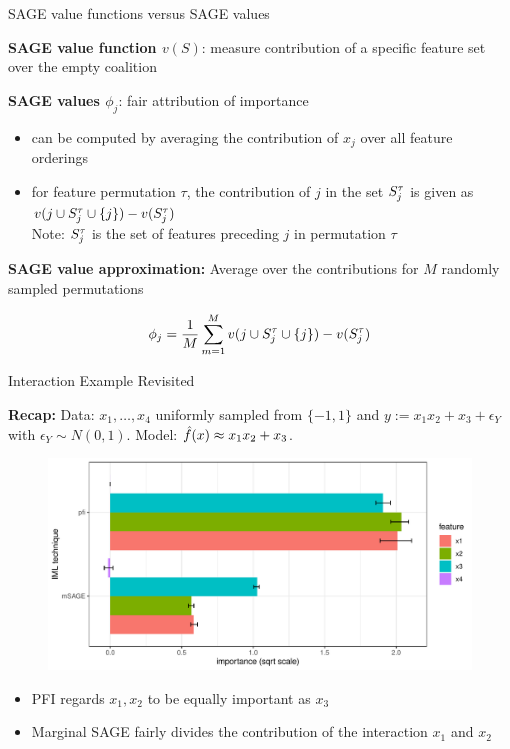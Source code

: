 \documentclass[11pt,compress,t,notes=noshow, aspectratio=169, xcolor=table]{beamer}
\begin{document}
\begin{frame}{SAGE value functions versus SAGE values}

\textbf{SAGE value function $v(S)$}: measure contribution of a specific feature set over the empty coalition

\lz\pause

\textbf{SAGE values $\phi_j$}: fair attribution of importance
\begin{itemize}
    \item can be computed by averaging the contribution of $x_j$ over all feature orderings
    \item for feature permutation $\tau$, the contribution of $j$ in the set $\Stau$ is given as $v(j \cup \Stauj) - v(\Stau)$\\
    Note: $\Stau$ is the set of features preceding $j$ in permutation $\tau$
\end{itemize}

\lz\pause

\textbf{SAGE value approximation:} Average over the contributions for $M$ randomly sampled permutations

\begin{align*}
    \phi_j = \frac{1}{M} \sum_{m=1}^M v(j \cup \Stauj) - v(\Stau)
\end{align*}
    
\end{frame}

\begin{frame}{Interaction Example Revisited}

\textbf{Recap:} Data: $x_1, \dots, x_4$ uniformly sampled from $\{-1, 1\}$ and $y:= x_1 x_2 + x_3 + \epsilon_Y$ with $\epsilon_Y \sim N(0, 1)$. Model: $\fh(x) \approx x_1 x_2 + x_3$.\\
%
\begin{figure}
  \includegraphics[width=0.65\linewidth]{figure_man/sage_pfi_interactions}
\end{figure}
%
\begin{itemize}
    \item PFI regards $x_1, x_2$ to be equally important as $x_3$
    \item Marginal SAGE fairly divides the contribution of the interaction $x_1$ and $x_2$
\end{itemize}

\end{frame}
\end{document}
